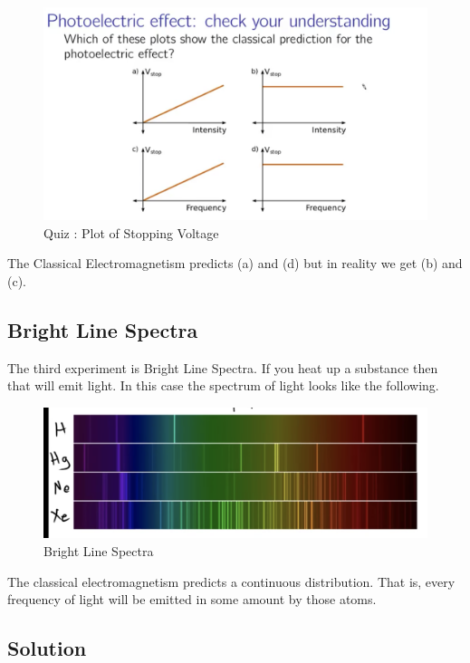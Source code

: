 \begin{figure}[ht!]
	\centering
	\includegraphics[scale=0.3]{./images/lecture_1_figure_3.png}
	\caption{Quiz : Plot of Stopping Voltage}
\end{figure}

The Classical Electromagnetism predicts (a) and (d) but in reality we get (b) and (c).

\pagebreak

\subsection{Bright Line Spectra}

The third experiment is Bright Line Spectra. 
If you heat up a substance then that will emit light.
In this case the spectrum of light looks like the following.

\begin{figure}[ht!]
	\centering
	\includegraphics[scale=0.3]{./images/lecture_1_figure_4.png}
	\caption{Bright Line Spectra}
\end{figure}

The classical electromagnetism predicts a continuous distribution.
That is, every frequency of light will be emitted in some amount by those atoms.

\subsection{Solution}

